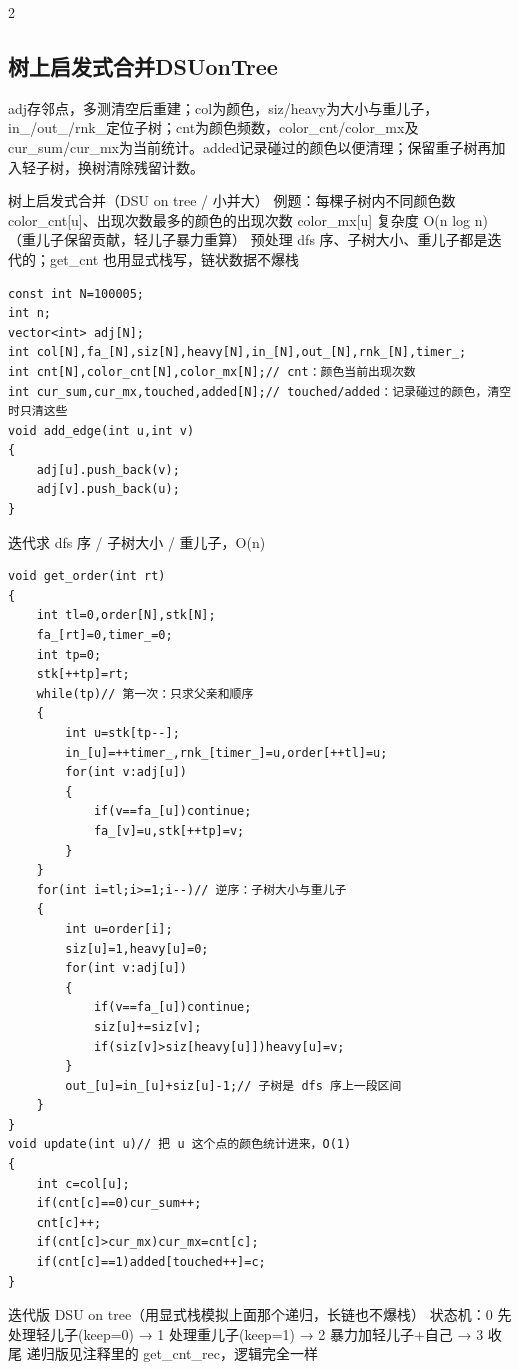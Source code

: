 \documentclass[UTF8,fontset=fandol,a4paper,twoside]{ctexart}
\newcommand{\note}[1]{{\fontsize{10}{12}\selectfont #1\par}}
\begin{document}
\begin{multicols}{2}
\subsection{树上启发式合并DSUonTree}

\note{adj存邻点，多测清空后重建；col为颜色，siz/\allowbreak{}heavy为大小与重儿子，in\_/\allowbreak{}out\_/\allowbreak{}rnk\_定位子树；cnt为颜色频数，color\_cnt/\allowbreak{}color\_mx及cur\_sum/\allowbreak{}cur\_mx为当前统计。added记录碰过的颜色以便清理；保留重子树再加入轻子树，换树清除残留计数。}
\note{树上启发式合并（DSU on tree /\allowbreak{} 小并大） 例题：每棵子树内不同颜色数 color\_cnt[\allowbreak{}u]\allowbreak{}、出现次数最多的颜色的出现次数 color\_mx[\allowbreak{}u]\allowbreak{} 复杂度 O(\allowbreak{}n log n)\allowbreak{}（重儿子保留贡献，轻儿子暴力重算） 预处理 dfs 序、子树大小、重儿子都是迭代的；get\_cnt 也用显式栈写，链状数据不爆栈}
\begin{lstlisting}
const int N=100005;
int n;
vector<int> adj[N];
int col[N],fa_[N],siz[N],heavy[N],in_[N],out_[N],rnk_[N],timer_;
int cnt[N],color_cnt[N],color_mx[N];// cnt：颜色当前出现次数
int cur_sum,cur_mx,touched,added[N];// touched/added：记录碰过的颜色，清空时只清这些
void add_edge(int u,int v)
{
    adj[u].push_back(v);
    adj[v].push_back(u);
}
\end{lstlisting}
\note{迭代求 dfs 序 /\allowbreak{} 子树大小 /\allowbreak{} 重儿子，O(\allowbreak{}n)\allowbreak{}}
\begin{lstlisting}
void get_order(int rt)
{
    int tl=0,order[N],stk[N];
    fa_[rt]=0,timer_=0;
    int tp=0;
    stk[++tp]=rt;
    while(tp)// 第一次：只求父亲和顺序
    {
        int u=stk[tp--];
        in_[u]=++timer_,rnk_[timer_]=u,order[++tl]=u;
        for(int v:adj[u])
        {
            if(v==fa_[u])continue;
            fa_[v]=u,stk[++tp]=v;
        }
    }
    for(int i=tl;i>=1;i--)// 逆序：子树大小与重儿子
    {
        int u=order[i];
        siz[u]=1,heavy[u]=0;
        for(int v:adj[u])
        {
            if(v==fa_[u])continue;
            siz[u]+=siz[v];
            if(siz[v]>siz[heavy[u]])heavy[u]=v;
        }
        out_[u]=in_[u]+siz[u]-1;// 子树是 dfs 序上一段区间
    }
}
void update(int u)// 把 u 这个点的颜色统计进来，O(1)
{
    int c=col[u];
    if(cnt[c]==0)cur_sum++;
    cnt[c]++;
    if(cnt[c]>cur_mx)cur_mx=cnt[c];
    if(cnt[c]==1)added[touched++]=c;
}
\end{lstlisting}
\note{迭代版 DSU on tree（用显式栈模拟上面那个递归，长链也不爆栈） 状态机：0 先处理轻儿子(\allowbreak{}keep=\allowbreak{}0)\allowbreak{} → 1 处理重儿子(\allowbreak{}keep=\allowbreak{}1)\allowbreak{} → 2 暴力加轻儿子+\allowbreak{}自己 → 3 收尾 递归版见注释里的 get\_cnt\_rec，逻辑完全一样}

\end{multicols}
\end{document}

